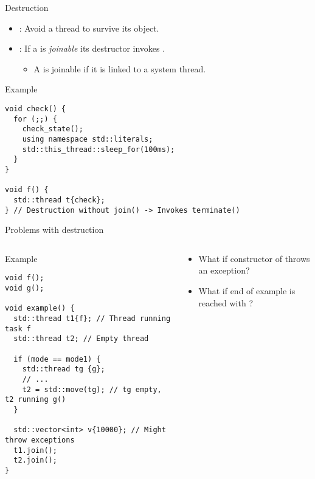 \begin{frame}[t,fragile]{Destruction}
\begin{itemize}
  \item {}: 
        Avoid a thread to survive its  object.
  \item {}: If a  is \emph{joinable} its destructor invokes .
    \begin{itemize}
      \item A  is joinable if it is linked to a system thread.
    \end{itemize}
\end{itemize}
\begin{block}{Example}
\begin{lstlisting}[basicstyle=\tiny]
void check() {
  for (;;) {
    check_state();
    using namespace std::literals;
    std::this_thread::sleep_for(100ms);
  }
}

void f() {
  std::thread t{check};
} // Destruction without join() -> Invokes terminate()
\end{lstlisting}
\end{block}
\end{frame}

\begin{frame}[t,fragile]{Problems with destruction}
\begin{columns}

\begin{column}{.65\textwidth}
\begin{block}{Example}
\begin{lstlisting}[basicstyle=\tiny]
void f();
void g();

void example() {
  std::thread t1{f}; // Thread running task f
  std::thread t2; // Empty thread

  if (mode == mode1) {
    std::thread tg {g}; 
    // ...
    t2 = std::move(tg); // tg empty, t2 running g()
  }

  std::vector<int> v{10000}; // Might throw exceptions
  t1.join();
  t2.join();
}
\end{lstlisting}
\end{block}
\end{column}

\begin{column}{.35\textwidth}
\begin{itemize}
  \item What if constructor of  throws an exception?
  \item What if end of example is reached with ?
\end{itemize}
\end{column}

\end{columns}
\end{frame}

